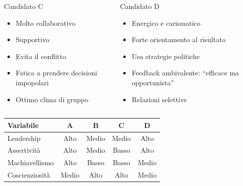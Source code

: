 \documentclass[compress]{beamer}
\begin{document}
\begin{frame}
\begin{columns}[T]
	
	
	
	\begin{block}{Candidato C}
		\begin{itemize}
			\item Molto collaborativo
			\item Supportivo
			\item Evita il conflitto
			\item Fatica a prendere decisioni impopolari
			\item Ottimo clima di gruppo
		\end{itemize}
	\end{block}
	
	

	
	\begin{block}{Candidato D}
		\begin{itemize}
			\item Energico e carismatico
			\item Forte orientamento al risultato
			\item Usa strategie politiche
			\item Feedback ambivalente: “efficace ma opportunista”
			\item Relazioni selettive
		\end{itemize}
	\end{block}
	
\end{columns}

	\small
\vspace{3mm}
\centering
\begin{tabular}{lcccc}
	\hline
	\textbf{Variabile} & \textbf{A} & \textbf{B} & \textbf{C} & \textbf{D} \\
	\hline
	Leadership & Alto & Medio & Medio & Alto \\
	Assertività & Alto & Medio & Basso & Alto \\
	Machiavellismo & Alto & Basso & Basso & Medio \\
	Coscienziosità & Medio & Alto & Alto & Medio \\
	\hline
\end{tabular}
\end{frame}
\end{document}
